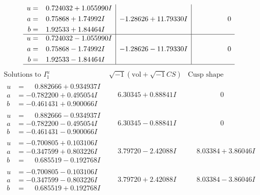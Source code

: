 \documentclass[1p]{elsarticle_modified}
\theoremstyle{definition}
\newcommand{\I}{\sqrt{-1}}
\begin{document}
$$\begin{array}{c|c|c}
\begin{aligned}
u &= \phantom{-}0.724032 + 1.055990 I \\
a &= \phantom{-}0.75868 + 1.74992 I \\
b &= \phantom{-}1.92533 + 1.84464 I\end{aligned}
 & -1.28626 + 11.79330 I & \phantom{-0.000000 } 0 \\ \hline\begin{aligned}
u &= \phantom{-}0.724032 - 1.055990 I \\
a &= \phantom{-}0.75868 - 1.74992 I \\
b &= \phantom{-}1.92533 - 1.84464 I\end{aligned}
 & -1.28626 - 11.79330 I & \phantom{-0.000000 } 0\\
 \hline 
 \end{array}$$\newpage$$\begin{array}{c|c|c}  
\text{Solutions to }I^u_{1}& \I (\text{vol} + \sqrt{-1}CS) & \text{Cusp shape}\\
 \hline 
\begin{aligned}
u &= \phantom{-}0.882666 + 0.934937 I \\
a &= -0.782200 + 0.495054 I \\
b &= -0.461431 + 0.900066 I\end{aligned}
 & \phantom{-}6.30345 + 0.88841 I & \phantom{-0.000000 } 0 \\ \hline\begin{aligned}
u &= \phantom{-}0.882666 - 0.934937 I \\
a &= -0.782200 - 0.495054 I \\
b &= -0.461431 - 0.900066 I\end{aligned}
 & \phantom{-}6.30345 - 0.88841 I & \phantom{-0.000000 } 0 \\ \hline\begin{aligned}
u &= -0.700805 + 0.103106 I \\
a &= -0.347599 + 0.803226 I \\
b &= \phantom{-}0.685519 - 0.192768 I\end{aligned}
 & \phantom{-}3.79720 - 2.42088 I & \phantom{-}8.03384 + 3.86046 I \\ \hline\begin{aligned}
u &= -0.700805 - 0.103106 I \\
a &= -0.347599 - 0.803226 I \\
b &= \phantom{-}0.685519 + 0.192768 I\end{aligned}
 & \phantom{-}3.79720 + 2.42088 I & \phantom{-}8.03384 - 3.86046 I \\ \hline\begin{aligned}

\end{aligned}
\end{array}$$
\end{document}
